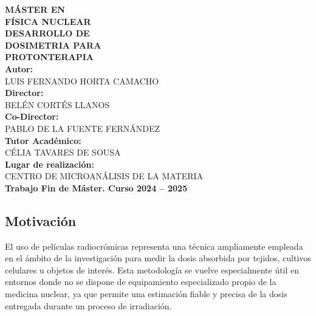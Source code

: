\documentclass[onecolumn,12pt]{article} %
\begin{document}
\thispagestyle{empty}

\begin{flushright}
    \vspace*{0.7cm}

    {\LARGE \textbf{MÁSTER EN}}\\
    {\LARGE \textbf{FÍSICA NUCLEAR}}\\[2cm]

    {\LARGE \textbf{DESARROLLO DE }}\\[0.3cm]
    {\LARGE \textbf{DOSIMETRIA PARA}}\\[0.3cm]
    {\LARGE \textbf{PROTONTERAPIA}}\\[3cm]

    {\Large \textbf{Autor:}}\\
    {\large LUIS FERNANDO HORTA CAMACHO}\\[1.5cm]

    {\Large \textbf{Director:}}\\
    {\large BELÉN CORTÉS LLANOS}\\[0.5cm]

    {\Large \textbf{Co-Director:}}\\
    {\large PABLO DE LA FUENTE FERNÁNDEZ}\\[0.5cm]

    {\Large \textbf{Tutor Académico:}}\\
    {\large CÉLIA TAVARES DE SOUSA}\\[2cm]

    {\Large \textbf{Lugar de realización:}}\\
    {\large CENTRO DE MICROANÁLISIS DE LA MATERIA}\\[3cm]

    {\large \textbf{Trabajo Fin de Máster. Curso 2024 -- 2025}}
\end{flushright}

\newpage %
\thispagestyle{empty} %
\mbox{} %
\newpage %

\tableofcontents
\newpage %

\subsection*{Motivación}

El uso de películas radiocrómicas representa una técnica ampliamente empleada en el ámbito de la investigación para medir la dosis absorbida por tejidos, cultivos celulares u objetos de interés. Esta metodología se vuelve especialmente útil en entornos donde no se dispone de equipamiento especializado propio de la medicina nuclear, ya que permite una estimación fiable y precisa de la dosis entregada durante un proceso de irradiación.
\end{document}
